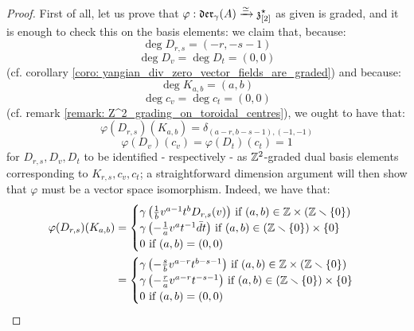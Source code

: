             \begin{proof}
                First of all, let us prove that $\varphi: \divzero \xrightarrow[]{\cong} \z_{[2]}^{\star}$ as given is graded, and it is enough to check this on the basis elements: we claim that, because:
                    $$\deg D_{r, s} = (-r, -s - 1)$$
                    $$\deg D_v = \deg D_t = (0, 0)$$
                (cf. corollary \ref{coro: yangian_div_zero_vector_fields_are_graded}) and because:
                    $$\deg K_{a, b} = (a, b)$$
                    $$\deg c_v = \deg c_t = (0, 0)$$
                (cf. remark \ref{remark: Z^2_grading_on_toroidal_centres}), we ought to have that:
                    $$\varphi(D_{r, s})(K_{a, b}) = \delta_{(a - r, b - s - 1), (-1, -1)}$$
                    $$\varphi(D_v)(c_v) = \varphi(D_t)(c_t) = 1$$
                for $D_{r, s}, D_v, D_t$ to be identified - respectively - as $\Z^2$-graded dual basis elements corresponding to $K_{r, s}, c_v, c_t$; a straightforward dimension argument will then show that $\varphi$ must be a vector space isomorphism. Indeed, we have that:
                    $$
                        \begin{aligned}
                            \varphi(D_{r, s})(K_{a, b}) & = 
                            \begin{cases}
                                \text{$\gamma\left( \frac1b v^{a - 1} t^b D_{r, s}(v) \right)$ if $(a, b) \in \Z \x (\Z \setminus \{0\})$}
                                \\
                                \text{$\gamma\left( -\frac1a v^a t^{-1} \bar{d}t \right)$ if $(a, b) \in (\Z \setminus \{0\}) \x \{0\}$}
                                \\
                                \text{$0$ if $(a, b) = (0, 0)$}
                            \end{cases}
                            \\
                            & = 
                            \begin{cases}
                                \text{$\gamma\left( -\frac{s}{b} v^{a - r} t^{b - s - 1} \right)$ if $(a, b) \in \Z \x (\Z \setminus \{0\})$}
                                \\
                                \text{$\gamma\left( -\frac{r}{a} v^{a - r} t^{-s - 1} \right)$ if $(a, b) \in (\Z \setminus \{0\}) \x \{0\}$}
                                \\
                                \text{$0$ if $(a, b) = (0, 0)$}

\end{cases}
\end{aligned}$$
\end{proof}

